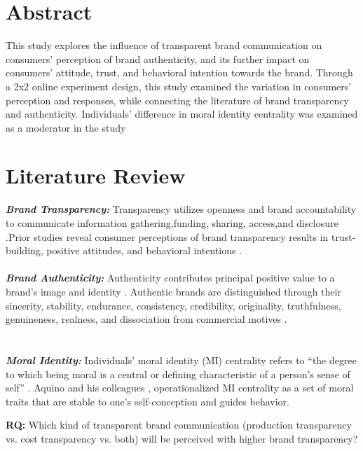 \documentclass[a0,portrait]{a0poster}
\begin{document}
\begin{minipage}[c]{\linewidth}
\begin{framed}
\begin{multicols}{2}
\section*{Abstract}
\color{Black}
This study explores the influence of transparent brand communication on consumers' perception of brand authenticity, and its further impact on consumers' attitude, trust, and behavioral intention towards the brand. Through a 2x2 online experiment design, this study examined the variation in consumers' perception and responses, while connecting the literature of brand transparency and authenticity. Individuals' difference in moral identity centrality was examined as a moderator in the study
\color{Maroon}
\section*{Literature Review}
\color{Black}
  \color{Maroon} \textbf{\emph{Brand Transparency:}} \color{Black}
Transparency utilizes openness\autocite{parris_exploring_2016} and brand accountability\autocite{yoo_brand_2014} to communicate information gathering,funding, sharing, access,and disclosure \autocite{phillips_online_2009}\autocite{wojdynski_measuring_2018} \autocite{yoo_brand_2014}\autocite{brandao_impact_2018}.Prior studies reveal consumer perceptions of brand transparency results in trust-building, positive attitudes, and behavioral intentions \autocite{reynolds_moral_2008}.\\
\\
  \color{Maroon} \textbf{\emph{Brand Authenticity:}} \color{Black} Authenticity contributes principal positive value to a brand's image \autocite{keller_strategic_1998}\autocite{ballantyne_evolution_2006} and identity \autocite{beverland_crafting_2005}\autocite{kapferer_new_2008}. Authentic brands are distinguished through their sincerity, stability, endurance, consistency, credibility, originality, truthfulness, genuineness, realness, and dissociation from commercial motives \autocite{bruhn_brand_2012}\autocite{grayson_consumer_2004}\autocite{ballantyne_evolution_2006}\autocite{beverland_real_2006}\autocite{holt_why_2002}. 
  \\
  
\\ 
\\
    \color{Maroon} \textbf{\emph{Moral Identity:}} \color{Black}Individuals’ moral identity (MI) centrality refers to “the degree to which being moral is a central or defining characteristic of a person’s sense of self” \autocite{blasi_moral_1994}.
    Aquino and his colleagues \autocite{aquino_self-importance_2002}\autocite{aquino_testing_2009}, operationalized MI centrality as a set of moral traits that are stable to one’s self-conception and guides behavior. 
    \\
   \begin{center}
  \color{Maroon} \textbf{RQ:} \color{Black}  Which kind of transparent brand communication (production transparency vs. cost transparency vs. both) will be perceived with higher brand transparency? \\


\end{center}
\end{multicols}
\end{framed}
\end{minipage}
\end{document}
